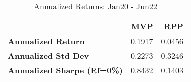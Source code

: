 \begin{table}
      \centering
      \begingroup
      \fontsize{9}{9}
      \selectfont 
\begin{tabular}{>{}lrr}
\toprule
  & MVP & RPP\\
\midrule
\textbf{Annualized Return} & 0.1917 & 0.0456\\
\textbf{Annualized Std Dev} & 0.2273 & 0.3246\\
\textbf{Annualized Sharpe (Rf=0\%)} & 0.8432 & 0.1403\\
\bottomrule
\end{tabular} \caption{Annualized Returns: Jan20 - Jun22}
      \label{tab: Low102 }  
      \endgroup{}
      \end{table}